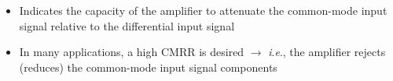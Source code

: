 \begin{itemize}
\begin{itemize}
\begin{itemize}
          \item Indicates the capacity of the amplifier to attenuate the common-mode input signal relative to the differential input signal

          \item In many applications, a high CMRR is desired $\to$ \textit{i}.\textit{e}., the amplifier rejects (reduces) the common-mode input signal components

        \end{itemize}

    \end{itemize}

\end{itemize}



